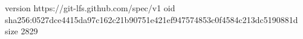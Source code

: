 version https://git-lfs.github.com/spec/v1
oid sha256:0527dce4415da97c162c21b90751e421ef947574853c0f4584c213dc5190881d
size 2829

